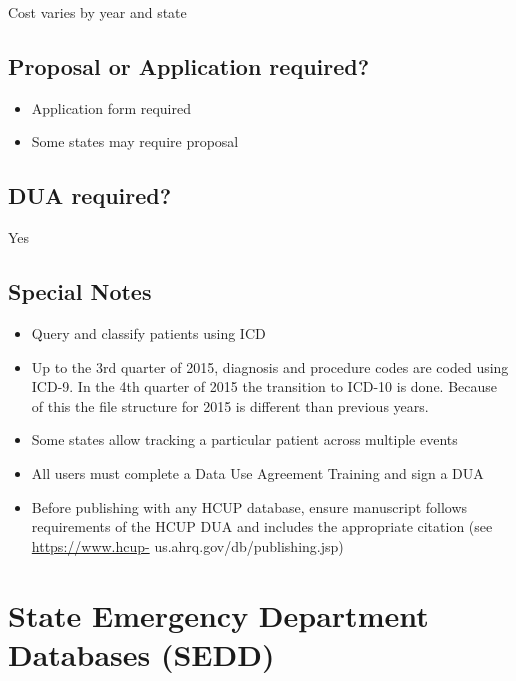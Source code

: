 \documentclass[
]{book}
\providecommand{\tightlist}{%
  \setlength{\itemsep}{0pt}\setlength{\parskip}{0pt}}
\begin{document}
Cost varies by year and state

\hypertarget{proposal-or-application-required-82}{%
\section{Proposal or Application required?}\label{proposal-or-application-required-82}}

\begin{itemize}
\tightlist
\item
  Application form required
\item
  Some states may require proposal
\end{itemize}

\hypertarget{dua-required-82}{%
\section{DUA required?}\label{dua-required-82}}

Yes

\hypertarget{special-notes-82}{%
\section{Special Notes}\label{special-notes-82}}

\begin{itemize}
\tightlist
\item
  Query and classify patients using ICD
\item
  Up to the 3rd quarter of 2015, diagnosis and procedure codes are coded using ICD-9. In the 4th quarter of 2015 the transition to ICD-10 is done. Because of this the file structure for 2015 is different than previous years.
\item
  Some states allow tracking a particular patient across multiple events
\item
  All users must complete a Data Use Agreement Training and sign a DUA
\item
  Before publishing with any HCUP database, ensure manuscript follows requirements of the HCUP DUA and includes the appropriate citation (see \url{https://www.hcup-} us.ahrq.gov/db/publishing.jsp)
\end{itemize}

\mainmatter

\hypertarget{state-emergency-department-databases-sedd}{%
\chapter{State Emergency Department Databases (SEDD)}\label{state-emergency-department-databases-sedd}}
\end{document}
